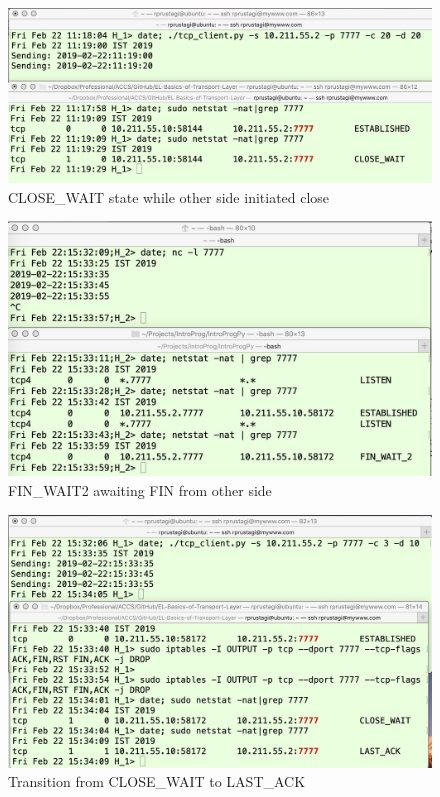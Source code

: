 \begin{figure}[!htb]
\centering
\includegraphics[scale=.45]{src/Figures/chap3/12.jpg}
\caption{CLOSE\_WAIT state while other side initiated close}\label{chap3-fig12}
\end{figure}

\begin{figure}[!htb]
\centering
\includegraphics[scale=.22]{src/Figures/chap3/13.jpg}
\caption{FIN\_WAIT2 awaiting FIN from other side}\label{chap3-fig13}
\end{figure}

\begin{figure}[!htb]
\centering
\includegraphics[scale=.21]{src/Figures/chap3/14.jpg}
\caption{Transition from CLOSE\_WAIT to LAST\_ACK}\label{chap3-fig14}
\end{figure}

